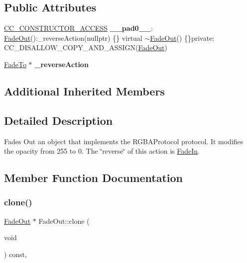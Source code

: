 \subsection*{Public Attributes}
\begin{DoxyCompactItemize}
\item 
\mbox{\label{classFadeOut_a2ad5cc4c6ffb4e967ae03ae378a76fb1}} 
\hyperlink{_2cocos2d_2cocos_2base_2ccConfig_8h_a25ef1314f97c35a2ed3d029b0ead6da0}{C\+C\+\_\+\+C\+O\+N\+S\+T\+R\+U\+C\+T\+O\+R\+\_\+\+A\+C\+C\+E\+SS} {\bfseries \+\_\+\+\_\+pad0\+\_\+\+\_\+}\+: \hyperlink{classFadeOut}{Fade\+Out}()\+:\+\_\+reverse\+Action(nullptr) \{\} virtual $\sim$\hyperlink{classFadeOut}{Fade\+Out}() \{\}private\+: C\+C\+\_\+\+D\+I\+S\+A\+L\+L\+O\+W\+\_\+\+C\+O\+P\+Y\+\_\+\+A\+N\+D\+\_\+\+A\+S\+S\+I\+GN(\hyperlink{classFadeOut}{Fade\+Out})
\item 
\mbox{\label{classFadeOut_a6534e9cd0fc9555820cd1ab88ee15ab7}} 
\hyperlink{classFadeTo}{Fade\+To} $\ast$ {\bfseries \+\_\+reverse\+Action}
\end{DoxyCompactItemize}
\subsection*{Additional Inherited Members}


\subsection{Detailed Description}
Fades Out an object that implements the R\+G\+B\+A\+Protocol protocol. It modifies the opacity from 255 to 0. The \char`\"{}reverse\char`\"{} of this action is \hyperlink{classFadeIn}{Fade\+In}. 

\subsection{Member Function Documentation}
\mbox{\label{classFadeOut_af06dabca5e73a8ed67560c2540bbbb1f}} 
\subsubsection{\texorpdfstring{clone()}{clone()}\hspace{0.1cm}{\footnotesize\ttfamily [1/2]}}
{\footnotesize\ttfamily \hyperlink{classFadeOut}{Fade\+Out} $\ast$ Fade\+Out\+::clone (\begin{DoxyParamCaption}\item[{void}]{ }\end{DoxyParamCaption}) const\hspace{0.3cm}{\ttfamily [override]}, {\ttfamily [virtual]}}

